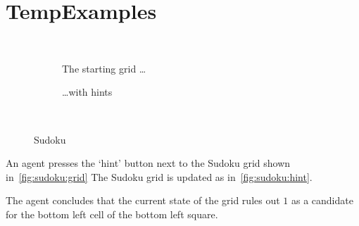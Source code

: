 \chapter{TempExamples}
\label{cha:tempexamples}

\begin{note}
  \begin{illustration}[Sudoku]
    \label{illu:gist:sudoku}
    \begin{figure}[H]
      \mbox{ }\hfill
      \begin{subfigure}{0.45\linewidth}
        \centering
        \sudokuGrid{}
        \caption{The starting grid \dots}
        \label{fig:sudoku:grid}
      \end{subfigure}
      \hfill
      \begin{subfigure}{0.45\linewidth}
        \centering
        \sudokuGridHints{}
        \caption{\dots with hints}
        \label{fig:sudoku:hint}
      \end{subfigure}
      \hfill\mbox{ }
      \caption{Sudoku}
      \label{fig:sudoku}
    \end{figure}
    An agent presses the `hint' button next to the Sudoku grid shown in~\autoref{fig:sudoku:grid}
    The Sudoku grid is updated as in~\autoref{fig:sudoku:hint}.

    The agent concludes that the current state of the grid rules out \(1\) as a candidate for the bottom left cell of the bottom left square.
  \end{illustration}
\end{note}



